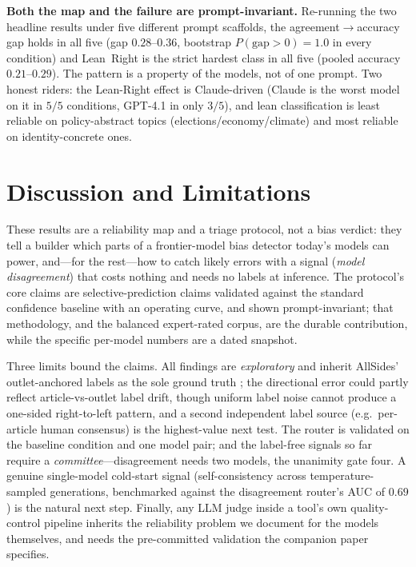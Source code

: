 \documentclass{article}
\begin{document}
\textbf{Both the map and the failure are prompt-invariant.} Re-running
the two headline results under five different prompt scaffolds, the
agreement$\to$accuracy gap holds in all five (gap $0.28$--$0.36$,
bootstrap $P(\text{gap}{>}0){=}1.0$ in every condition) and Lean~Right is
the strict hardest class in all five (pooled accuracy $0.21$--$0.29$).
The pattern is a property of the models, not of one prompt. Two honest
riders: the Lean-Right effect is Claude-driven (Claude is the worst model
on it in $5/5$ conditions, GPT-4.1 in only $3/5$), and lean
classification is least reliable on policy-abstract topics
(elections/economy/climate) and most reliable on identity-concrete ones.

\section{Discussion and Limitations}
These results are a reliability map and a triage protocol, not a bias
verdict: they tell a builder which parts of a frontier-model bias
detector today's models can power, and---for the rest---how to catch
likely errors with a signal (\emph{model disagreement}) that costs
nothing and needs no labels at inference. The protocol's core claims are
selective-prediction claims validated against the standard confidence
baseline with an operating curve, and shown prompt-invariant; that
methodology, and the balanced expert-rated corpus, are the durable
contribution, while the specific per-model numbers are a dated snapshot.

Three limits bound the claims. All findings are \emph{exploratory} and
inherit AllSides' outlet-anchored labels as the sole ground truth
\citep{baly2020detect}; the directional error could partly reflect
article-vs-outlet label drift, though uniform label noise cannot produce
a one-sided right-to-left pattern, and a second independent label source
(e.g.\ per-article human consensus) is the highest-value next test. The
router is validated on the baseline condition and one model pair; and the
label-free signals so far require a \emph{committee}---disagreement needs
two models, the unanimity gate four. A genuine single-model cold-start
signal (self-consistency across temperature-sampled generations,
benchmarked against the disagreement router's AUC of $0.69$) is the
natural next step. Finally, any LLM judge inside a tool's own
quality-control pipeline inherits the reliability problem we document for
the models themselves, and needs the pre-committed validation the
companion paper specifies.



\end{document}
